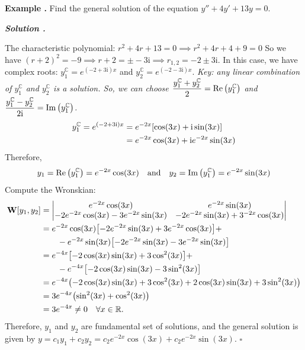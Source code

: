 \documentclass[12pt, a4paper]{article}
\newcounter{index}[subsection]
\newenvironment*{eg}{\begin{framed}\par\noindent\textbf{Example \thesubsection.\stepcounter{index}\theindex}}{\par\end{framed}}
\newcounter{nprf}[subsection]
\newenvironment*{sol}{\par\indent\textbf{\textit{Solution \stepcounter{nprf}\thenprf.}}\par}{\hfill{$\square$}\par}
\def\R{{\mathbb{R}}}
\def\C{{\mathbb{C}}}
\def\i{{\mathrm{i}}}
\def\W{\vb W}
\begin{document}
\begin{eg}
	Find the general solution of the equation $y''+4y'+13y=0$. 
	\begin{sol}
		The characteristic polynomial: $r^2+4r+13=0\implies r^2+4r+4+9=0$ So we have $(r+2)^2=-9\implies r+2=\pm-3\i \implies r_{1,2}=-2\pm3\i$. In this case, we have complex roots: $y_1^\C=e^{(-2+3\i)x}$ and $y_2^\C=e^{(-2-3\i)x}$. \textit{Key: any linear combination of $y_1^\C$ and $y_2^\C$ is a solution. So, we can choose $\dfrac{y_1^\C+y_2^\C}{2}=\Re\qty(y_1^\C)$ and $\dfrac{y_1^\C-y_2^\C}{2\i}=\Im\qty(y_1^\C)$.} \begin{align*}y_1^\C=e^{(-2+3\i)x}&=e^{-2x}\qty[\cos(3x)+\i\sin(3x)]\\&=e^{-2x}\cos(3x)+\i e^{-2x}\sin(3x)\end{align*} Therefore, \[y_1=\Re\qty(y_1^\C)=e^{-2x}\cos(3x)\quad\text{and}\quad y_2=\Im\qty(y_1^\C)=e^{-2x}\sin(3x)\] Compute the Wronskian: \begin{align*}\W\qty[y_1,y_2]&=\mqty|e^{-2x}\cos(3x)&e^{-2x}\sin(3x)\\-2e^{-2x}\cos(3x)-3e^{-2x}\sin(3x)&-2e^{-2x}\sin(3x)+3^{-2x}\cos(3x)|\\&=e^{-2x}\cos(3x)\qty[-2e^{-2x}\sin(3x)+3e^{-2x}\cos(3x)]+\\&\qquad-e^{-2x}\sin(3x)\qty[-2e^{-2x}\sin(3x)-3e^{-2x}\sin(3x)]\\&=e^{-4x}\qty[-2\cos(3x)\sin(3x)+3\cos^2(3x)]+\\&\qquad-e^{-4x}\qty[-2\cos(3x)\sin(3x)-3\sin^2(3x)]\\&=e^{-4x}\qty(-2\cos(3x)\sin(3x)+3\cos^2(3x)+2\cos(3x)\sin(3x)+3\sin^2(3x))\\&=3e^{-4x}\qty(\sin^2(3x)+\cos^2(3x))\\&=3e^{-4x}\neq0\quad\forall x\in\R.\end{align*} Therefore, $y_1$ and $y_2$ are fundamental set of solutions, and the general solution is given by  $y=c_1y_1+c_2y_2=c_2e^{-2x}\cos(3x)+c_2e^{-2x}\sin(3x).$
	\end{sol}
\end{eg}
\end{document}
